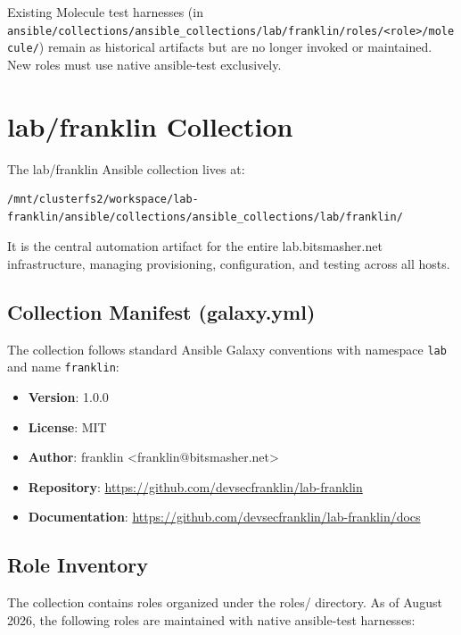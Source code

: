 Existing Molecule test harnesses (in \texttt{ansible/collections/ansible\_collections/lab/franklin/roles/\textless role\textgreater /molecule/}) remain as historical artifacts but are no longer invoked or maintained. New roles must use native ansible-test exclusively.

\chapter{lab/franklin Collection}

The lab/franklin Ansible collection lives at:
\begin{lstlisting}[style=mystyle]
/mnt/clusterfs2/workspace/lab-franklin/ansible/collections/ansible_collections/lab/franklin/
    \end{lstlisting}

It is the central automation artifact for the entire lab.bitsmasher.net infrastructure, managing provisioning, configuration, and testing across all hosts.

\section{Collection Manifest (galaxy.yml)}

The collection follows standard Ansible Galaxy conventions with namespace \texttt{lab} and name \texttt{franklin}:

\begin{itemize}
    \item \textbf{Version}: 1.0.0
    
    \item \textbf{License}: MIT
    
    \item \textbf{Author}: franklin <franklin@bitsmasher.net>
    
    \item \textbf{Repository}: \url{https://github.com/devsecfranklin/lab-franklin}
    
    \item \textbf{Documentation}: \url{https://github.com/devsecfranklin/lab-franklin/docs}
\end{itemize}

\section{Role Inventory}

The collection contains roles organized under the roles/ directory. As of August 2026, the following roles are maintained with native ansible-test harnesses:

